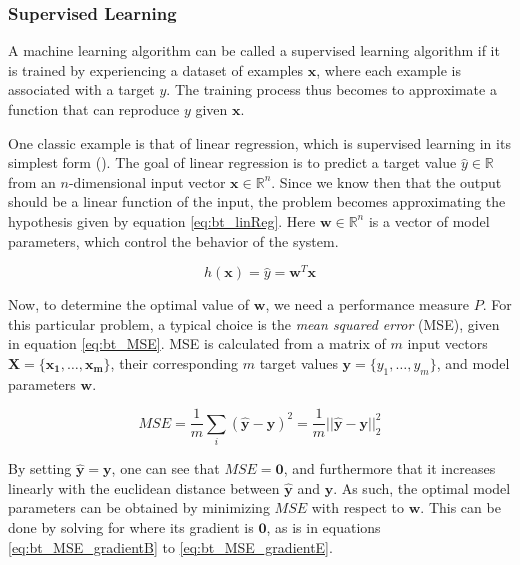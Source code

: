 \subsubsection{Supervised Learning}

A machine learning algorithm can be called a supervised learning algorithm if it is trained by experiencing a dataset of examples $\mathbf{x}$, where each example is associated with a target $y$. The training process thus becomes to approximate a function that can reproduce $y$ given $\mathbf{x}$.

One classic example is that of linear regression, which is supervised learning in its simplest form (\cite{goodfellow2016}). The goal of linear regression is to predict a target value $\hat{y}\in\mathbb{R}$ from an $n$-dimensional input vector $\mathbf{x}\in\mathbb{R}^n$. Since we know then that the output should be a linear function of the input, the problem becomes approximating the hypothesis given by equation \ref{eq:bt_linReg}. Here $\mathbf{w}\in\mathbb{R}^n$ is a vector of model parameters, which control the behavior of the system.

\begin{equation}
    \label{eq:bt_linReg}
    h(\mathbf{x})=\hat{y}=\mathbf{w}^T\mathbf{x}
\end{equation}

Now, to determine the optimal value of $\mathbf{w}$, we need a performance measure $P$. For this particular problem, a typical choice is the \textit{mean squared error} (MSE), given in equation \ref{eq:bt_MSE}. MSE is calculated from a matrix of $m$ input vectors $\mathbf{X}=\{\mathbf{x_1},\dots,\mathbf{x_m}\}$, their corresponding $m$ target values $\mathbf{y}=\{y_1,\dots,y_m\}$, and model parameters $\mathbf{w}$.

\begin{equation}
    \label{eq:bt_MSE}
    MSE=\frac{1}{m}\sum_{i}(\hat{\mathbf{y}}-\mathbf{y})^2
    =\frac{1}{m}||\hat{\mathbf{y}}-\mathbf{y}||^2_2
\end{equation}

By setting $\hat{\mathbf{y}}=\mathbf{y}$, one can see that $MSE=\mathbf{0}$, and furthermore that it increases linearly with the euclidean distance between $\hat{\mathbf{y}}$ and $\mathbf{y}$. As such, the optimal model parameters can be obtained by minimizing $MSE$ with respect to $\mathbf{w}$. This can be done by solving for where its gradient is $\mathbf{0}$, as is in equations \ref{eq:bt_MSE_gradientB} to \ref{eq:bt_MSE_gradientE}.

